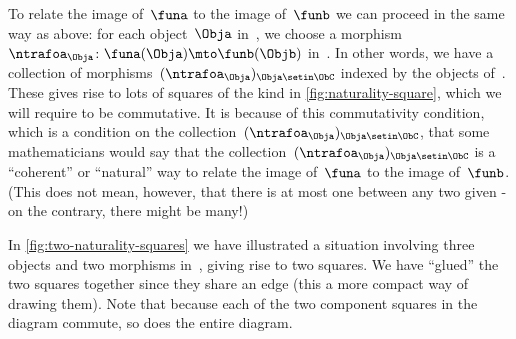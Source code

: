 To relate the image of~$\funa$ to the image of~$\funb$ we can proceed in the same way as above: for each object~$\Obja$ in~\CatC, we choose a morphism~$\ntrafoa_\Obja \colon \funa(\Obja) \mto \funb(\Objb)$ in~\CatD.
In other words, we have a collection of morphisms~$(\ntrafoa_\Obja)_{\Obja \setin \ObC}$ indexed by the objects of~\CatC.
These gives rise to lots of squares of the kind in \cref{fig:naturality-square}, which we will require to be commutative.
It is because of this commutativity condition, which is a condition on the collection~$(\ntrafoa_\Obja)_{\Obja \setin \ObC}$, that some mathematicians would say that the collection~$(\ntrafoa_\Obja)_{\Obja \setin \ObC}$ is a ``coherent'' or ``natural'' way to relate the image of~$\funa$ to the image of~$\funb$.
(This does not mean, however, that there is at most one  between any two given - on the contrary, there might be many!)

\begin{marginfigure}
    \centering
    \caption{}
    \label{fig:two-naturality-squares}
\end{marginfigure}

In \cref{fig:two-naturality-squares} we have illustrated a situation involving three objects and two morphisms in~\CatC, giving rise to two squares.
We have ``glued'' the two squares together since they share an edge (this a more compact way of drawing them).
Note that because each of the two component squares in the diagram commute, so does the entire diagram.

%
%

\


